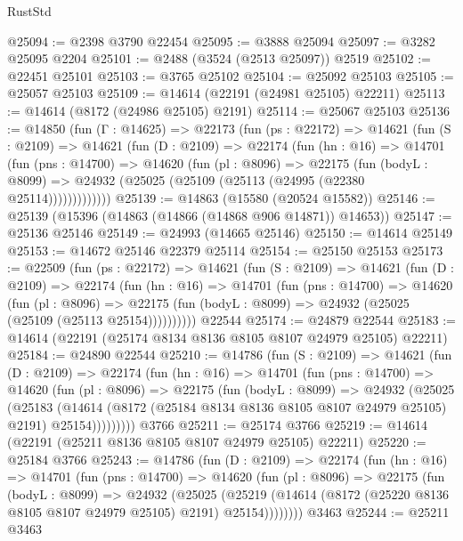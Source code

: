 \begin{lexlean}{RustStd}
\begin{coremodule}
@25094 := @2398 @3790 @22454
@25095 := @3888 @25094
@25097 := @3282 @25095 @2204
@25101 := @2488 (@3524 (@2513 @25097)) @2519
@25102 := @22451 @25101
@25103 := @3765 @25102
@25104 := @25092 @25103
@25105 := @25057 @25103
@25109 := @14614 (@22191 (@24981 @25105) @22211)
@25113 := @14614 (@8172 (@24986 @25105) @2191)
@25114 := @25067 @25103
@25136 := @14850
    (fun (Γ : @14625) =>
    @22173
      (fun (ps : @22172) =>
      @14621
        (fun (S : @2109) =>
        @14621
          (fun (D : @2109) =>
          @22174
            (fun (hn : @16) =>
            @14701
              (fun (pns : @14700) =>
              @14620
                (fun (pl : @8096) =>
                @22175
                  (fun (bodyL : @8099) =>
                  @24932 (@25025 (@25109 (@25113 (@24995 (@22380 @25114)))))))))))))
@25139 := @14863 (@15580 (@20524 @15582))
@25146 := @25139 (@15396 (@14863 (@14866 (@14868 @906 @14871)) @14653))
@25147 := @25136 @25146
@25149 := @24993 (@14665 @25146)
@25150 := @14614 @25149
@25153 := @14672 @25146 @22379 @25114
@25154 := @25150 @25153
@25173 := @22509
    (fun (ps : @22172) =>
    @14621
      (fun (S : @2109) =>
      @14621
        (fun (D : @2109) =>
        @22174
          (fun (hn : @16) =>
          @14701
            (fun (pns : @14700) =>
            @14620
              (fun (pl : @8096) =>
              @22175 (fun (bodyL : @8099) => @24932 (@25025 (@25109 (@25113 @25154))))))))))
    @22544
@25174 := @24879 @22544
@25183 := @14614 (@22191 (@25174 @8134 @8136 @8105 @8107 @24979 @25105) @22211)
@25184 := @24890 @22544
@25210 := @14786
    (fun (S : @2109) =>
    @14621
      (fun (D : @2109) =>
      @22174
        (fun (hn : @16) =>
        @14701
          (fun (pns : @14700) =>
          @14620
            (fun (pl : @8096) =>
            @22175
              (fun (bodyL : @8099) =>
              @24932
                (@25025
                  (@25183
                    (@14614
                      (@8172 (@25184 @8134 @8136 @8105 @8107 @24979 @25105) @2191)
                      @25154)))))))))
    @3766
@25211 := @25174 @3766
@25219 := @14614 (@22191 (@25211 @8136 @8105 @8107 @24979 @25105) @22211)
@25220 := @25184 @3766
@25243 := @14786
    (fun (D : @2109) =>
    @22174
      (fun (hn : @16) =>
      @14701
        (fun (pns : @14700) =>
        @14620
          (fun (pl : @8096) =>
          @22175
            (fun (bodyL : @8099) =>
            @24932
              (@25025
                (@25219
                  (@14614 (@8172 (@25220 @8136 @8105 @8107 @24979 @25105) @2191) @25154))))))))
    @3463
@25244 := @25211 @3463

\end{coremodule}
\end{lexlean}

